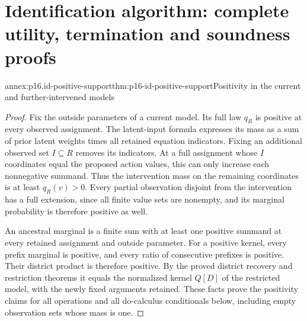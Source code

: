 \section{Identification algorithm: complete utility, termination and soundness proofs}
\label{sec:annex-p16-identification-algorithm}

\begin{annexitem}{annex:p16.id-positive-support}{thm:p16-id-positive-support}{Positivity in the current and further-intervened models}
\begin{proof}
Fix the outside parameters of a current model. Its full law \(q_R\)
is positive at every observed assignment. The latent-input formula
expresses its mass as a sum of prior latent weights times all
retained equation indicators. Fixing an additional observed set
\(I\subseteq R\) removes its indicators. At a full assignment
whose \(I\) coordinates equal the proposed action values, this
can only increase each nonnegative summand. Thus the intervention
mass on the remaining coordinates is at least \(q_R(v)>0\).
Every partial observation disjoint from the intervention has a full
extension, since all finite value sets are nonempty, and its marginal
probability is therefore positive as well.

An ancestral marginal is a finite sum with at least one positive
summand at every retained assignment and outside parameter. For a
positive kernel, every prefix marginal is positive, and every ratio
of consecutive prefixes is positive. Their district product is
therefore positive. By the proved district recovery and restriction
theorems it equals the normalized kernel \(Q[D]\) of the restricted
model, with the newly fixed arguments retained. These facts prove
the positivity claims for all operations and all do-calculus
conditionals below, including empty observation sets whose mass is one.
\end{proof}
\end{annexitem}

